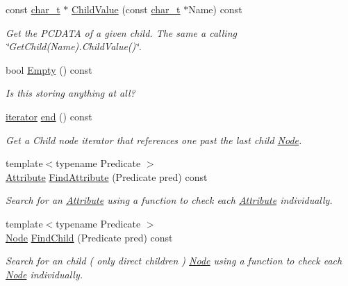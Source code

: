 \begin{DoxyCompactItemize}
const \hyperlink{namespaceMezzanine_1_1xml_a29b8a47c179e9895c4e9e66c45d1dbbc}{char\_\-t} $\ast$ \hyperlink{classMezzanine_1_1xml_1_1Node_a4888fd417d117f8261b64ce5ab6854d3}{ChildValue} (const \hyperlink{namespaceMezzanine_1_1xml_a29b8a47c179e9895c4e9e66c45d1dbbc}{char\_\-t} $\ast$Name) const 
\begin{DoxyCompactList}\small\item\em Get the PCDATA of a given child. The same a calling \char`\"{}GetChild(Name).ChildValue()\char`\"{}. \item\end{DoxyCompactList}\item 
bool \hyperlink{classMezzanine_1_1xml_1_1Node_a3143d34f7cd807136c0e08a9ee67ca41}{Empty} () const 
\begin{DoxyCompactList}\small\item\em Is this storing anything at all? \item\end{DoxyCompactList}\item 
\hyperlink{classMezzanine_1_1xml_1_1NodeIterator}{iterator} \hyperlink{classMezzanine_1_1xml_1_1Node_a08959c7e0c3f93be643dc3a29b40060b}{end} () const 
\begin{DoxyCompactList}\small\item\em Get a Child node iterator that references one past the last child \hyperlink{classMezzanine_1_1xml_1_1Node}{Node}. \item\end{DoxyCompactList}\item 
{\footnotesize template$<$typename Predicate $>$ }\\\hyperlink{classMezzanine_1_1xml_1_1Attribute}{Attribute} \hyperlink{classMezzanine_1_1xml_1_1Node_afbac679468f12378abbe025d57991fde}{FindAttribute} (Predicate pred) const 
\begin{DoxyCompactList}\small\item\em Search for an \hyperlink{classMezzanine_1_1xml_1_1Attribute}{Attribute} using a function to check each \hyperlink{classMezzanine_1_1xml_1_1Attribute}{Attribute} individually. \item\end{DoxyCompactList}\item 
{\footnotesize template$<$typename Predicate $>$ }\\\hyperlink{classMezzanine_1_1xml_1_1Node}{Node} \hyperlink{classMezzanine_1_1xml_1_1Node_af0b5f737f895f650faa83131a86ee2ac}{FindChild} (Predicate pred) const 
\begin{DoxyCompactList}\small\item\em Search for an child ( only direct children ) \hyperlink{classMezzanine_1_1xml_1_1Node}{Node} using a function to check each \hyperlink{classMezzanine_1_1xml_1_1Node}{Node} individually. \item\end{DoxyCompactList}\item 

\end{DoxyCompactItemize}
